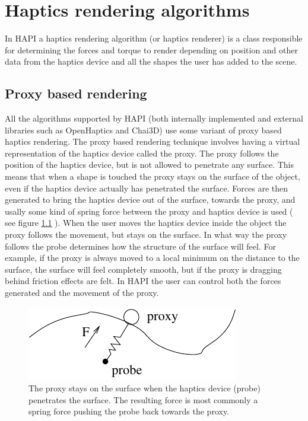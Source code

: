 
\chapter {Haptics rendering algorithms}
\label{secHapticsRenderingAlgorithms}
In HAPI a haptics rendering algorithm (or haptics renderer) is a class
responsible for determining the forces and torque to render depending
on position and other data from the haptics device and all the shapes
the user has added to the scene. 

\section{Proxy based rendering}
All the algorithms supported by HAPI (both internally implemented and
external libraries such as OpenHaptics and Chai3D) use some variant of
proxy based haptics rendering. The proxy based rendering technique
involves having a virtual representation of the haptics device called
the proxy. The proxy follows the position of the haptics device, but
is not allowed to penetrate any surface. This means that when a
shape is touched the proxy stays on the surface of the object, even
if the haptics device actually has penetrated the surface. Forces are
then generated to bring the haptics device out of the surface, towards
the proxy, and usally some kind of spring force between the proxy and
haptics device is used ( see figure \ref{Proxy-probe} ). When the user 
moves the haptics device inside
the object the proxy follows the movement, but stays on the surface. In what way the
proxy follows the probe determines how the structure of the surface will
feel. For example, if the proxy is always moved to a local minimum on
the distance to the surface, the surface will feel completely smooth,
but if the proxy is dragging behind friction effects are felt. In
HAPI the user can control both the forces generated and the movement
of the proxy.

\begin{figure} 
  \centering 
  \includegraphics{images/proxyfinger.pdf}
  \caption{The proxy stays on the surface when the haptics
  device (probe) penetrates the surface. The resulting force is most
  commonly a spring force pushing the probe back towards the proxy.} 
  \label{Proxy-probe} 
\end{figure}



